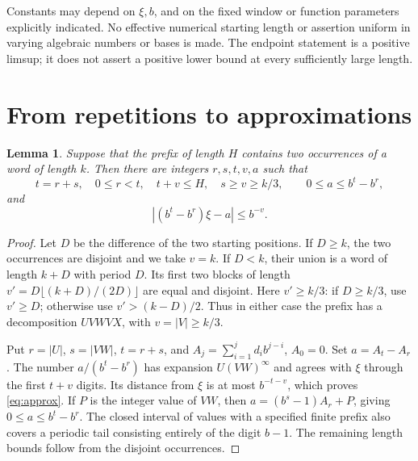 \documentclass[11pt]{article}
\numberwithin{equation}{section}
\newtheorem{lemma}[theorem]{Lemma}
\theoremstyle{remark}\newtheorem{remark}[theorem]{Remark}
\begin{document}
Constants may depend on $\xi,b$, and on the fixed window or function
parameters explicitly indicated. No effective numerical starting
length or assertion uniform in varying algebraic numbers or bases
is made. The endpoint statement is a positive limsup; it does not
assert a positive lower bound at every sufficiently large length.

\section{From repetitions to approximations}\label{sec:words}
\begin{lemma}\label{lem:words}
Suppose that the prefix of length $H$ contains two occurrences of a
word of length $k$. Then there are integers $r,s,t,v,a$ such that
\begin{equation}\label{eq:repeat}
 t=r+s,\quad 0\le r<t,\quad t+v\le H,\quad s\ge v\ge k/3,
 \qquad 0\le a\le b^t-b^r,
\end{equation}
and
\begin{equation}\label{eq:approx}
 |(b^t-b^r)\xi-a|\le b^{-v}.
\end{equation}
\end{lemma}
\begin{proof}
Let $D$ be the difference of the two starting positions. If $D\ge k$,
the two occurrences are disjoint and we take $v=k$. If $D<k$, their
union is a word of length $k+D$ with period $D$. Its first two blocks
of length $v'=D\lfloor(k+D)/(2D)\rfloor$ are equal and disjoint.
Here $v'\ge k/3$: if $D\ge k/3$, use $v'\ge D$; otherwise use
$v'>(k-D)/2$. Thus in either case the prefix has a decomposition
$UVWVX$, with $v=|V|\ge k/3$.

Put $r=|U|$, $s=|VW|$, $t=r+s$, and
$A_j=\sum_{i=1}^jd_ib^{j-i}$, $A_0=0$. Set $a=A_t-A_r$.
The number $a/(b^t-b^r)$ has expansion $U(VW)^\infty$ and agrees with
$\xi$ through the first $t+v$ digits. Its distance from $\xi$ is at most
$b^{-t-v}$, which proves \eqref{eq:approx}. If $P$ is the integer value
of $VW$, then $a=(b^s-1)A_r+P$, giving $0\le a\le b^t-b^r$.
The closed interval of values with a specified finite prefix also
covers a periodic tail consisting entirely of the digit $b-1$.
The remaining length bounds follow from the disjoint occurrences.
\end{proof}
\end{document}

